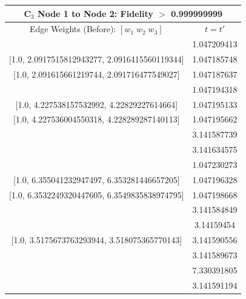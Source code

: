 \documentclass[reprint, aps, 12pt, floatfix]{revtex4-2}
\begin{document}
\begin{center}
    \begin{tabular}{||c c||}
        \multicolumn{2}{c}{C$_3$ Node 1 to Node 2: Fidelity $>$ 0.999999999}\\
        \hline
        Edge Weights (Before): $[w_1 \; w_2 \; w_3]$&$t=t'$\\
        \hline
        [1.0, 2.0916488556893857, 2.091614476453943]&1.047209413\\

        [1.0, 2.0917515812943277, 2.0916415560119344]&1.047185748\\

        [1.0, 2.091615661219744, 2.091716477549027]&1.047187637\\
        \hline
        [1.0, 4.227542432731449, 4.228295065841354]&1.047194318\\

        [1.0, 4.227538157532992, 4.22829227614664]&1.047195133\\

        [1.0, 4.227536004550318, 4.228289287140113]&1.047195662\\
        \hline
        [1.0, 5.64541775078533, 5.646164349155414]&3.141587739\\
        \hline
        [1.0, 1.369309304509472, 1.3692909635456583]&3.141634575\\
        \hline
        [1.0, 6.3541518473873095, 6.354143536884679]&1.047230273\\

        [1.0, 6.355041232947497, 6.353281446657205]&1.047196328\\

        [1.0, 6.3532249320447605, 6.3549835838974795]&1.047198668\\
        \hline
        [1.0, 0.6123972894962187, 0.6123745624670441]&3.141584849\\
        \hline
        [1.0, 3.518055948672872, 3.5175491236546765]&3.14159454\\

        [1.0, 3.5175673763293944, 3.518075365770143]&3.141590556\\
        \hline
        [1.0, 2.8064066043074347, 2.8060994691493977]&3.141589673\\
        \hline
        [1.0, 0.4922986614010462, 0.492266407009438]&7.330391805\\
        \hline
        [1.0, 4.936592240678165, 4.937635439362065]&3.141591194\\
        \hline
    \end{tabular}
\end{center}
\end{document}
